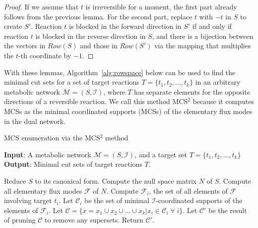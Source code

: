 \documentclass{bioinfo}
\theoremstyle{plain}
\theoremstyle{definition}
\begin{document}

\begin{proof}%
If we assume that $t$ is irreversible for a moment, the first part already follows from the previous lemma. For the second part, replace $t$ with $-t$ in $S$ to create $S'$. Reaction $t$ is blocked in the forward direction in $S'$ if and only if reaction $t$ is blocked in the reverse direction in $S$, and there is a bijection between the vectors in $Row(S)$ and those in $Row(S')$ via the mapping that multiplies the $t$-th coordinate by $-1$. %
\end{proof}

With these lemmas, Algorithm~\ref{alg:rowspace} below can be used to find the minimal cut sets for a set of target reactions $T = \{t_1, t_2, ..., t_k\}$ in an arbitrary metabolic network $\mathcal{M} = (S, \mathcal{I})$, where $T$ has separate elements for the opposite directions of a reversible reaction. We call this method MCS$^2$ because it computes MCSs as the minimal coordinated supports (MCSs) of the elementary flux modes in the dual network.


\begin{algorithm}[ht!]
    \caption{MCS enumeration via the MCS$^2$ method}
    \textbf{Input}: A metabolic network $\mathcal{M} = (S, \mathcal{I})$, and a target set $T=\{t_1, t_2, \dots, t_k\}$\\
    \textbf{Output}: Minimal cut sets of target reactions $T$.
    \begin{algorithmic}[1]
            \bigskip
            \State Reduce $S$ to its canonical form.
            \State Compute the null space matrix $N$ of $S$.
            \State Compute all elementary flux modes $\mathcal{F}$ of $N$.
             Compute $\mathcal{F}_i$, the set of all elements of $\mathcal{F}$ involving target $t_i$. 
            \EndFor
             Let $\mathcal{C}_i$ be the set of minimal $\mathcal{I}$-coordinated supports of the elements of $\mathcal{F}_i$. 
            \EndFor
            \State Let $\mathcal{C} =  \{x = x_1 \cup x_2 \cup ... \cup x_k|x_i \in \mathcal{C}_i \; \forall \; i\}$.
            \State Let $\mathcal{C}'$ be the result of pruning $\mathcal{C}$ to remove any supersets.
            \State Return $\mathcal{C}'$.
            \EndFunction
    \end{algorithmic}
    \label{alg:rowspace}
\end{algorithm}
\end{document}
